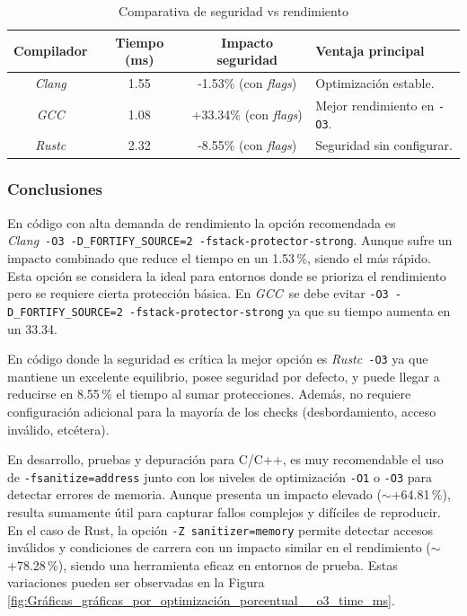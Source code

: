 \begin{table}[H]
\centering
\footnotesize
\begin{tabular}{|c|c|c|l|}
\hline
\textbf{Compilador} & \textbf{Tiempo (ms)} & \textbf{Impacto seguridad} & \textbf{Ventaja principal} \\
\hline
\emph{Clang} & 1.55 & -1.53\% (con \emph{flags}) & Optimización estable. \\
\emph{GCC}     & 1.08 & +33.34\% (con \emph{flags}) & Mejor rendimiento en \texttt{-O3}. \\
\emph{Rustc}   & 2.32 & -8.55\% (con \emph{flags}) & Seguridad sin configurar. \\
\hline
\end{tabular}
\caption{Comparativa de seguridad vs rendimiento}
\label{tab:seguridad_vs_rendimiento}
\end{table}

\subsubsection{Conclusiones}

En código con alta demanda de rendimiento la opción recomendada es\\
\emph{Clang}\ \texttt{-O3}\ \texttt{-D\_FORTIFY\_SOURCE=2\ -fstack-protector-strong}.
Aunque sufre un impacto combinado que reduce el tiempo en un 1.53\,\%,
siendo el más rápido. Esta opción se considera la ideal para entornos donde se
prioriza el rendimiento pero se requiere cierta protección básica.
En \emph{GCC}\ se debe evitar \texttt{-O3}\ \texttt{-D\_FORTIFY\_SOURCE=2\ -fstack-protector-strong}
ya que su tiempo aumenta en un 33.34.

En código donde la seguridad es crítica la mejor opción es
\emph{Rustc}\ \texttt{-O3} ya que mantiene un excelente equilibrio, posee
seguridad por defecto, y puede llegar a reducirse en 8.55\,\% el tiempo al
sumar protecciones. Además, no requiere configuración adicional para la
mayoría de los checks (desbordamiento, acceso inválido, etcétera).

En desarrollo, pruebas y depuración para C/C++, es muy recomendable el uso de
\texttt{-fsanitize=address} junto con los niveles de optimización \texttt{-O1} o \texttt{-O3} para
detectar errores de memoria. Aunque presenta un impacto elevado
($\sim$+64.81\,\%), resulta sumamente útil para capturar fallos complejos y difíciles de reproducir.
En el caso de Rust, la opción
\texttt{-Z\ sanitizer=memory} permite detectar accesos inválidos y condiciones de carrera con un impacto
similar en el rendimiento ($\sim$+78.28\,\%), siendo una herramienta eficaz en entornos de prueba. Estas variaciones
pueden ser observadas en la Figura \ref{fig:Gráficas_gráficas_por_optimización_porcentual__o3_time_ms}.

